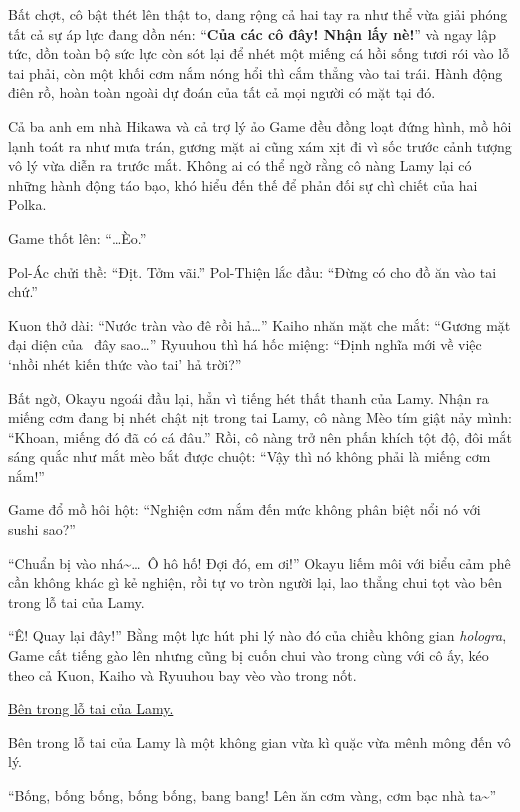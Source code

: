 \documentclass[../main.tex]{subfiles}
\begin{document}
Bất chợt, cô bật thét lên thật to, dang rộng cả hai tay ra như thể vừa giải phóng tất cả sự áp lực đang dồn nén: ``\textbf{Của các cô đây! Nhận lấy nè!}'' và ngay lập tức, dồn toàn bộ sức lực còn sót lại để nhét một miếng cá hồi sống tươi rói vào lỗ tai phải, còn một khối cơm nắm nóng hổi thì cắm thẳng vào tai trái. Hành động điên rồ, hoàn toàn ngoài dự đoán của tất cả mọi người có mặt tại đó.


Cả ba anh em nhà Hikawa và cả trợ lý ảo Game đều đồng loạt đứng hình, mồ hôi lạnh toát ra như mưa trán, gương mặt ai cũng xám xịt đi vì sốc trước cảnh tượng vô lý vừa diễn ra trước mắt. Không ai có thể ngờ rằng cô nàng Lamy lại có những hành động táo bạo, khó hiểu đến thế để phản đối sự chì chiết của hai Polka.

Game thốt lên: ``\dots Èo.''

Pol-Ác chửi thề: ``Địt. Tởm vãi.'' Pol-Thiện lắc đầu: ``Đừng có cho đồ ăn vào tai chứ.''

Kuon thở dài: ``Nước tràn vào đê rồi hả\dots'' Kaiho nhăn mặt che mắt: ``Gương mặt đại diện của \hll\ đây sao\dots'' Ryuuhou thì há hốc miệng: ``Định nghĩa mới về việc `nhồi nhét kiến thức vào tai' hả trời?''

Bất ngờ, Okayu ngoái đầu lại, hẳn vì tiếng hét thất thanh của Lamy. Nhận ra miếng cơm đang bị nhét chật nịt trong tai Lamy, cô nàng Mèo tím giật nảy mình: ``Khoan, miếng đó đã có cá đâu.'' Rồi, cô nàng trở nên phấn khích tột độ, đôi mắt sáng quắc như mắt mèo bắt được chuột: ``Vậy thì nó không phải là miếng cơm nắm!''

Game đổ mồ hôi hột: ``Nghiện cơm nắm đến mức không phân biệt nổi nó với sushi sao?''

``Chuẩn bị vào nhá\~{}\dots\ Ô hô hố! Đợi đó, em ơi!'' Okayu liếm môi với biểu cảm phê cần không khác gì kẻ nghiện, rồi tự vo tròn người lại, lao thẳng chui tọt vào bên trong lỗ tai của Lamy.

``Ê! Quay lại đây!'' Bằng một lực hút phi lý nào đó của chiều không gian \textit{hologra}, Game cất tiếng gào lên nhưng cũng bị cuốn chui vào trong cùng với cô ấy, kéo theo cả Kuon, Kaiho và Ryuuhou bay vèo vào trong nốt.

\begin{center}
    \uline{Bên trong lỗ tai của Lamy.}
\end{center}

Bên trong lỗ tai của Lamy là một không gian vừa kì quặc vừa mênh mông đến vô lý.

``Bống, bống bống, bống bống, bang bang! Lên ăn cơm vàng, cơm bạc nhà ta\~{}''
\end{document}
